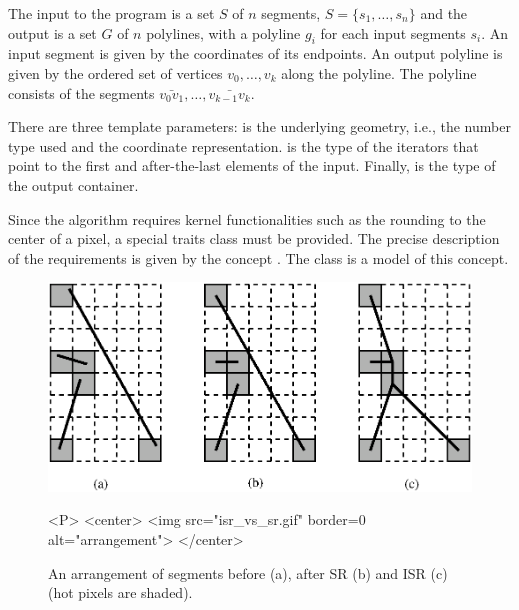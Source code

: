 The input to the program is a set $S$ of $n$ segments,
$S=\{s_1,\ldots,s_n\}$ and the output is a set $G$ of $n$ polylines,
with a polyline $g_i$ for each input segments $s_i$. An input segment
is given by the coordinates of its endpoints. An output polyline is
given by the ordered set of vertices $v_0,\ldots,v_k$ along the polyline.
The polyline consists of the segments $\bar{v_0v_1},\ldots,\bar{v_{k-1}v_k}$.

There are three template parameters:  is the underlying geometry,
i.e., the number type used and the coordinate representation.
 is the type of the iterators that point to the first
and after-the-last elements of the input. Finally,  is the
type of the output container.

Since the algorithm requires kernel functionalities such as the rounding to the
center of a pixel, a special traits class must be provided. The precise
description of the requirements is given by the concept
. The class  is a model of
this concept.

\begin{figure}
\begin{ccTexOnly}
\centerline{\includegraphics{Snap_rounding_2/isr_vs_sr.ps}}
\end{ccTexOnly}

\caption{An arrangement of segments before (a), after SR (b)
and ISR (c) (hot pixels are shaded).}
\label{fig:isr_vs_sr}

\begin{ccHtmlOnly}
<P>
<center>
  <img src="isr_vs_sr.gif"  border=0 alt="arrangement">
</center>
\end{ccHtmlOnly}
\end{figure}


